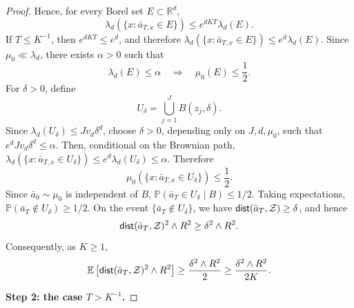 \documentclass{article}
\newcommand{\1}{\mathbbm{1}}
\newcommand{\dist}{{\sf dist}}
\numberwithin{equation}{section}
\begin{document}
\begin{proof}
Hence, for every Borel set \(E\subset\mathbb R^d\),
$$
\lambda_d\left(\{x:\bar a_{T,x}\in E\}\right)
\le
e^{dKT}\lambda_d(E).
$$
If \(T\le K^{-1}\), then \(e^{dKT}\le e^d\), and therefore
$
\lambda_d\left(\{x:\bar a_{T,x}\in E\}\right)
\le
e^d\lambda_d(E).
$
Since \(\mu_0\ll\lambda_d\), there exists \(\alpha>0\) such that
\[
\lambda_d(E)\le \alpha
\quad\Longrightarrow\quad
\mu_0(E)\le \frac12 .
\]
For \(\delta>0\), define
\[
U_\delta=\bigcup_{j=1}^J B(z_j,\delta).
\]
Since \(\lambda_d(U_\delta)\le J v_d\delta^d\), choose \(\delta>0\),
depending only on \(J,d,\mu_0\), such that
$
e^d J v_d\delta^d\le \alpha .
$
Then, conditional on the Brownian path,
$
\lambda_d\left(\{x:\bar a_{T,x}\in U_\delta\}\right)
\le
e^d\lambda_d(U_\delta)
\le
\alpha.
$
Therefore
\[
\mu_0\left(\{x:\bar a_{T,x}\in U_\delta\}\right)\le\frac12.
\]
Since \(\bar a_0\sim\mu_0\) is independent of \(B\),
$
\mathbb P(\bar a_T\in U_\delta\mid B)\le 1/2.
$
Taking expectations,
$
\mathbb P(\bar a_T\notin U_\delta)\ge1/2.
$
On the event \(\{\bar a_T\notin U_\delta\}\), we have
\(\dist(\bar a_T,\mathcal Z)\ge\delta\), and hence
\[
\dist(\bar a_T,\mathcal Z)^2\wedge R^2
\ge
\delta^2\wedge R^2.
\]
Consequently, as $K\geq 1$,
\[
\mathbb E\left[\dist(\bar a_T,\mathcal Z)^2\wedge R^2\right]
\ge
\frac{\delta^2\wedge R^2}{2}
\ge
\frac{\delta^2\wedge R^2}{2K}.
\]
\medskip

\textbf{Step 2: the case \(T>K^{-1}\).}


\end{proof}
\end{document}
